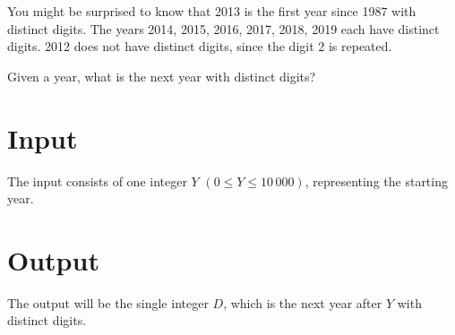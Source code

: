 You might be surprised to know that 2013 is the first year since 1987 with distinct digits. The
years 2014, 2015, 2016, 2017, 2018, 2019 each have distinct digits. 2012 does not have distinct
digits, since the digit 2 is repeated.

Given a year, what is the next year with distinct digits?

\section*{Input}
The input consists of one integer $Y$ $(0 \le Y \le 10\,000)$, representing the starting year.

\section*{Output}
The output will be the single integer $D$, which is the next year after $Y$ with distinct digits.
